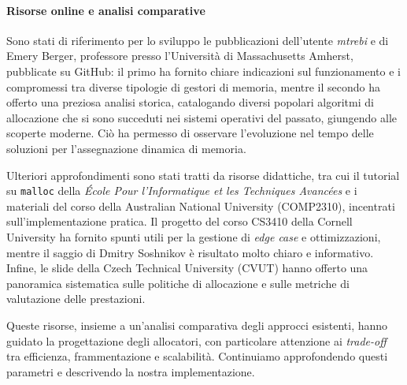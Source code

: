 \paragraph{Risorse online e analisi comparative}

Sono stati di riferimento per lo sviluppo le pubblicazioni dell’utente \textit{mtrebi}\cite{mtrebi} e di Emery Berger, professore presso l’Università di Massachusetts Amherst\cite{emeryberger}, pubblicate su GitHub: il primo ha fornito chiare indicazioni sul funzionamento e i compromessi tra diverse tipologie di gestori di memoria, mentre il secondo ha offerto una preziosa analisi storica, catalogando diversi popolari algoritmi di allocazione che si sono succeduti nei sistemi operativi del passato, giungendo alle scoperte moderne. Ciò ha permesso di osservare l’evoluzione nel tempo delle soluzioni per l'assegnazione dinamica di memoria.

Ulteriori approfondimenti sono stati tratti da risorse didattiche, tra cui il tutorial su \texttt{malloc} della \textit{École Pour l'Informatique et les Techniques Avancées}\cite{epita-malloc} e i materiali del corso della Australian National University (COMP2310)\cite{anu-malloc}, incentrati sull’implementazione pratica. Il progetto del corso CS3410 della Cornell University\cite{cornell-malloc} ha fornito spunti utili per la gestione di \textit{edge case} e ottimizzazioni, mentre il saggio di Dmitry Soshnikov\cite{soshnikov-allocator} è risultato molto chiaro e informativo. Infine, le slide della Czech Technical University (CVUT)\cite{cvut-dynamic-mem} hanno offerto una panoramica sistematica sulle politiche di allocazione e sulle metriche di valutazione delle prestazioni.

Queste risorse, insieme a un’analisi comparativa degli approcci esistenti, hanno guidato la progettazione degli allocatori, con particolare attenzione ai \textit{trade-off} tra efficienza, frammentazione e scalabilità. Continuiamo approfondendo questi parametri e descrivendo la nostra implementazione.